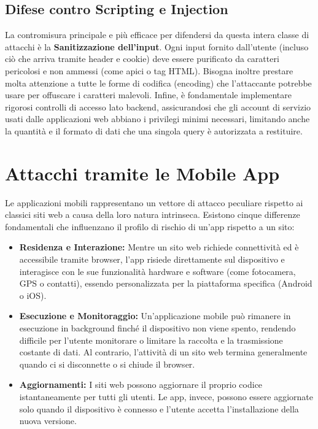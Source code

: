 \documentclass{article}
\begin{document}
\subsection*{Difese contro Scripting e Injection}

La contromisura principale e più efficace per difendersi da questa intera classe di attacchi è la \textbf{Sanitizzazione dell'input}. Ogni input fornito dall'utente (incluso ciò che arriva tramite header e cookie) deve essere purificato da caratteri pericolosi e non ammessi (come apici o tag HTML). Bisogna inoltre prestare molta attenzione a tutte le forme di codifica (encoding) che l'attaccante potrebbe usare per offuscare i caratteri malevoli. Infine, è fondamentale implementare rigorosi controlli di accesso lato backend, assicurandosi che gli account di servizio usati dalle applicazioni web abbiano i privilegi minimi necessari, limitando anche la quantità e il formato di dati che una singola query è autorizzata a restituire.

\vspace{0.8cm}

\section*{Attacchi tramite le Mobile App}

Le applicazioni mobili rappresentano un vettore di attacco peculiare rispetto ai classici siti web a causa della loro natura intrinseca. Esistono cinque differenze fondamentali che influenzano il profilo di rischio di un'app rispetto a un sito:

\begin{itemize}
    \item \textbf{Residenza e Interazione:} Mentre un sito web richiede connettività ed è accessibile tramite browser, l'app risiede direttamente sul dispositivo e interagisce con le sue funzionalità hardware e software (come fotocamera, GPS o contatti), essendo personalizzata per la piattaforma specifica (Android o iOS).
    \item \textbf{Esecuzione e Monitoraggio:} Un'applicazione mobile può rimanere in esecuzione in background finché il dispositivo non viene spento, rendendo difficile per l'utente monitorare o limitare la raccolta e la trasmissione costante di dati. Al contrario, l'attività di un sito web termina generalmente quando ci si disconnette o si chiude il browser.
    \item \textbf{Aggiornamenti:} I siti web possono aggiornare il proprio codice istantaneamente per tutti gli utenti. Le app, invece, possono essere aggiornate solo quando il dispositivo è connesso e l'utente accetta l'installazione della nuova versione.
\end{itemize}
\end{document}
